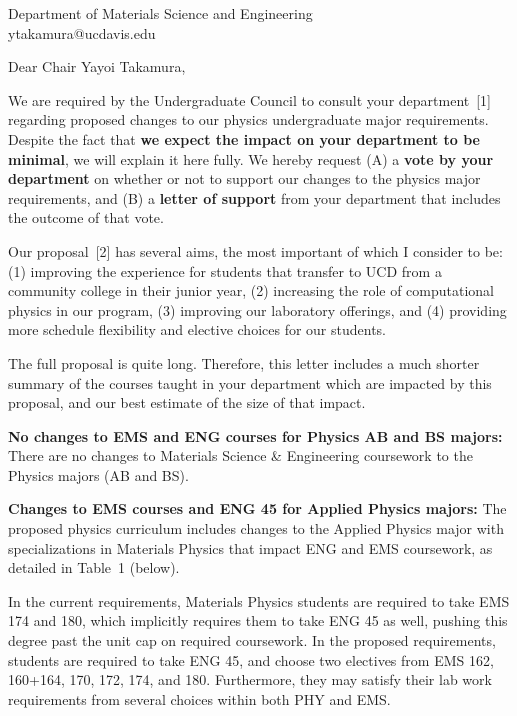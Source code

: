 \documentclass[letterpaper,12pt]{letter}
\def\letterparta{
We are required by the Undergraduate Council to consult your
department~[1] regarding proposed changes to our physics undergraduate major requirements.  Despite the fact that {\bf we expect the
  impact on your department to be minimal}, we will explain it here
fully.  We hereby request (A) a {\bf vote by your department} on
whether or not to support our changes to the physics major
requirements, and (B) a {\bf letter of support} from your department
that includes the outcome of that vote.

Our proposal~[2] has several aims, the most important of which I
consider to be: (1) improving the experience for students that
transfer to UCD from a community college in their junior year, (2)
increasing the role of computational physics in our program, (3)
improving our laboratory offerings, and (4) providing more schedule
flexibility and elective choices for our students.

The full proposal is quite long.  Therefore, this letter includes a
much shorter summary of the courses taught in your department which
are impacted by this proposal, and our best estimate of the size of
that impact.
}
\begin{document}
\begin{letter}{Department of Materials Science and Engineering \\ ytakamura@ucdavis.edu}

\opening{Dear Chair Yayoi Takamura,}

\letterparta

{\bf No changes to EMS and ENG courses for Physics AB and BS majors:}
There are no changes to Materials Science \& Engineering coursework
to the Physics majors (AB and BS).

{\bf Changes to EMS courses and ENG 45 for Applied Physics majors:}
The proposed physics curriculum includes changes to the Applied
Physics major with specializations in Materials Physics that impact
ENG and EMS coursework, as detailed in Table~1 (below).

In the current requirements, Materials Physics students are required
to take EMS 174 and 180, which implicitly requires them to take ENG 45
as well, pushing this degree past the unit cap on required coursework.
In the proposed requirements, students are required to take ENG 45,
and choose two electives from EMS 162, 160+164, 170, 172, 174, and
180.  Furthermore, they may satisfy their lab work requirements from
several choices within both PHY and EMS.


\end{letter}
\end{document}
